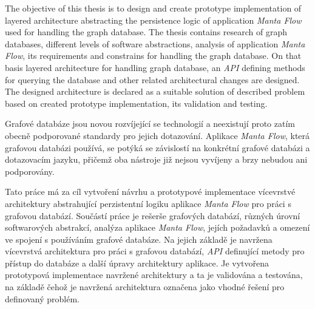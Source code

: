 \documentclass[11pt,twoside,a4paper]{book}
\begin{document}
   The objective of this thesis is to design and create prototype implementation of layered architecture abstracting the persistence logic of application \textit{Manta Flow} used for handling the graph database.
   The thesis contains research of graph databases, different levels of software abstractions, analysis of application \textit{Manta Flow}, its requirements and constrains for handling the graph database. On that basis layered architecture for handling graph database, an \textit{API} defining methods for querying the database and other related architectural changes are designed. The designed architecture is declared as a suitable solution of described problem based on created prototype implementation, its validation and testing.


	\baselineskip

	Grafové databáze jsou novou rozvíjející se technologií a neexistují proto zatím obecně podporované standardy pro jejich dotazování. Aplikace \textit{Manta Flow}, která grafovou databázi používá, se potýká se závislostí na konkrétní grafové databázi a dotazovacím jazyku, přičemž oba nástroje již nejsou vyvíjeny a brzy nebudou ani podporovány.

   Tato práce má za cíl vytvoření návrhu a prototypové implementace vícevrstvé architektury abstrahující perzistentní logiku aplikace \textit{Manta Flow} pro práci s grafovou databází.
   Součástí práce je rešerše grafových databází, různých úrovní softwarových abstrakcí, analýza aplikace \textit{Manta Flow}, jejích požadavků a omezení ve spojení s používáním grafové databáze. Na jejich základě je navržena vícevrstvá architektura pro práci s grafovou databází, \textit{API} definující metody pro přístup do databáze a další úpravy architektury aplikace. Je vytvořena prototypová implementace navržené architektury a ta je validována a testována, na základě čehož je navržená architektura označena jako vhodné řešení pro definovaný problém.


	\tableofcontents		%

	\listoffigures			%
	\listoftables			%
	\lstlistoflistings         %

	\mainbodystarts
\end{document}
